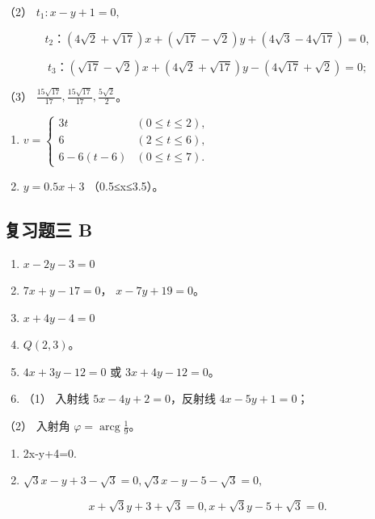 （2） \(t_{1}: x - y + 1 = 0,\)

\[
t_{2}\text{：} (4 \sqrt {2} + \sqrt {17}) x + (\sqrt {17} - \sqrt {2}) y + (4 \sqrt {3} - 4 \sqrt {17}) = 0,
\]

\[
t_{3}\text{：} (\sqrt {17} - \sqrt {2}) x + (4 \sqrt {2} + \sqrt {17}) y - (4 \sqrt {17} + \sqrt {2}) = 0;
\]

（3）
\(\frac{15\sqrt{17}}{17}, \frac{15\sqrt{17}}{17}, \frac{5\sqrt{2}}{2}\)。

\begin{enumerate}
\def\labelenumi{\arabic{enumi}.}
\setcounter{enumi}{12}
\item
  \(v = \left\{ \begin{array}{ll}3t & (0\leqslant t\leqslant 2),\\ 6 & (2\leqslant t\leqslant 6),\\ 6 - 6(t - 6) & (0\leqslant t\leqslant 7). \end{array} \right.\)
\item
  \(y = 0.5x + 3\) （0.5≤x≤3.5）。
\end{enumerate}

\subsection{复习题三 B}\label{ux590dux4e60ux9898ux4e09-b-1}

\begin{enumerate}
\def\labelenumi{\arabic{enumi}.}
\item
  \(x - 2y - 3 = 0\)
\item
  \(7x + y - 17 = 0\)， \(x - 7y + 19 = 0\)。
\item
  \(x + 4y - 4 = 0\)
\item
  \(Q(2, 3)\)。
\item
  \(4x + 3y - 12 = 0\) 或 \(3x + 4y - 12 = 0\)。
\item
  （1） 入射线 \(5x - 4y + 2 = 0\)，反射线 \(4x - 5y + 1 = 0\)；
\end{enumerate}

（2） 入射角 \(\varphi=\operatorname{arcg}\frac{1}{9}\)。

\begin{enumerate}
\def\labelenumi{\arabic{enumi}.}
\setcounter{enumi}{6}
\item
  2x-y+4=0.
\item
  \(\sqrt{3} x - y + 3 - \sqrt{3} = 0, \sqrt{3} x - y - 5 - \sqrt{3} = 0,\)
\end{enumerate}

\[
x + \sqrt {3} y + 3 + \sqrt {3} = 0, x + \sqrt {3} y - 5 + \sqrt {3} = 0.
\]

